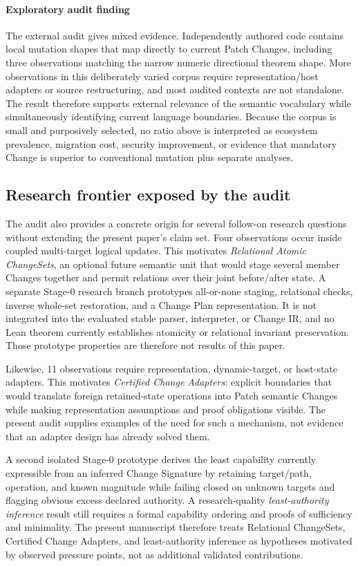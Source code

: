 \paragraph{Exploratory audit finding}
The external audit gives mixed evidence. Independently authored code contains local mutation shapes that map directly to current Patch Changes, including three observations matching the narrow numeric directional theorem shape. More observations in this deliberately varied corpus require representation/host adapters or source restructuring, and most audited contexts are not standalone. The result therefore supports external relevance of the semantic vocabulary while simultaneously identifying current language boundaries. Because the corpus is small and purposively selected, no ratio above is interpreted as ecosystem prevalence, migration cost, security improvement, or evidence that mandatory Change is superior to conventional mutation plus separate analyses.

\subsection{Research frontier exposed by the audit}
The audit also provides a concrete origin for several follow-on research questions without extending the present paper's claim set. Four observations occur inside coupled multi-target logical updates. This motivates \emph{Relational Atomic ChangeSets}, an optional future semantic unit that would stage several member Changes together and permit relations over their joint before/after state. A separate Stage-0 research branch prototypes all-or-none staging, relational checks, inverse whole-set restoration, and a Change Plan representation. It is not integrated into the evaluated stable parser, interpreter, or Change IR, and no Lean theorem currently establishes atomicity or relational invariant preservation. Those prototype properties are therefore not results of this paper.

Likewise, 11 observations require representation, dynamic-target, or host-state adapters. This motivates \emph{Certified Change Adapters}: explicit boundaries that would translate foreign retained-state operations into Patch semantic Changes while making representation assumptions and proof obligations visible. The present audit supplies examples of the need for such a mechanism, not evidence that an adapter design has already solved them.

A second isolated Stage-0 prototype derives the least capability currently expressible from an inferred Change Signature by retaining target/path, operation, and known magnitude while failing closed on unknown targets and flagging obvious excess declared authority. A research-quality \emph{least-authority inference} result still requires a formal capability ordering and proofs of sufficiency and minimality. The present manuscript therefore treats Relational ChangeSets, Certified Change Adapters, and least-authority inference as hypotheses motivated by observed pressure points, not as additional validated contributions.


